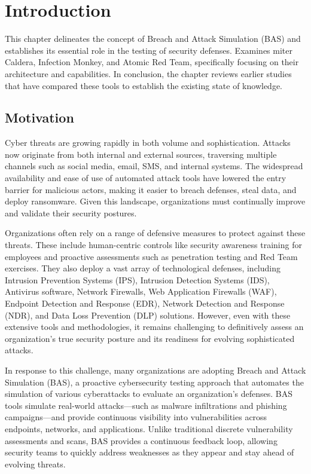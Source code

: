 \chapter{Introduction}\label{chap:intro}
This chapter delineates the concept of Breach and Attack Simulation (BAS) and establishes its essential role in the testing of security defenses. Examines miter Caldera, Infection Monkey, and Atomic Red Team, specifically focusing on their architecture and capabilities. In conclusion, the chapter reviews earlier studies that have compared these tools to establish the existing state of knowledge.
\section{Motivation}\label{sec:Motivation}
Cyber threats are growing rapidly in both volume and sophistication. Attacks now originate from both internal and external sources, traversing multiple channels such as social media, email, SMS, and internal systems\cite{verizon2024}. The widespread availability and ease of use of automated attack tools have lowered the entry barrier for malicious actors, making it easier to breach defenses, steal data, and deploy ransomware\cite{enisa2024}. Given this landscape, organizations must continually improve and validate their security postures.

Organizations often rely on a range of defensive measures to protect against these threats. These include human-centric controls like security awareness training for employees and proactive assessments such as penetration testing and Red Team exercises. They also deploy a vast array of technological defenses, including Intrusion Prevention Systems (IPS), Intrusion Detection Systems (IDS), Antivirus software, Network Firewalls, Web Application Firewalls (WAF), Endpoint Detection and Response (EDR), Network Detection and Response (NDR), and Data Loss Prevention (DLP) solutions\cite{nist80053}. However, even with these extensive tools and methodologies, it remains challenging to definitively assess an organization’s true security posture and its readiness for evolving sophisticated attacks\cite{mandiant2023}.

In response to this challenge, many organizations are adopting Breach and Attack Simulation (BAS), a proactive cybersecurity testing approach that automates the simulation of various cyberattacks to evaluate an organization’s defenses\cite{gartner_bas}. BAS tools simulate real-world attacks—such as malware infiltrations and phishing campaigns—and provide continuous visibility into vulnerabilities across endpoints, networks, and applications. Unlike traditional discrete vulnerability assessments and scans, BAS provides a continuous feedback loop, allowing security teams to quickly address weaknesses as they appear and stay ahead of evolving threats.

